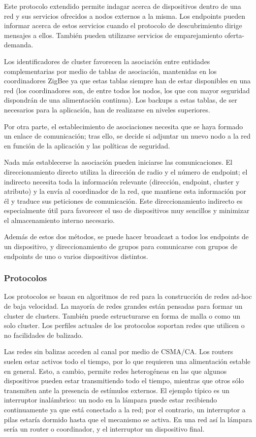 Este protocolo extendido permite indagar acerca de dispositivos dentro de una red y sus servicios ofrecidos a nodos
externos a la misma. Los endpoints pueden informar acerca de estos servicios cuando el protocolo de descubrimiento
dirige mensajes a ellos. Tambi\'en pueden utilizarse servicios de emparejamiento oferta-demanda.

Los identificadores de cluster favorecen la asociaci\'on entre entidades complementarias por medio de tablas de
asociaci\'on, mantenidas en los coordinadores ZigBee ya que estas tablas siempre han de estar disponibles en una red (los
coordinadores son, de entre todos los nodos, los que con mayor seguridad dispondr\'an de una alimentaci\'on continua). Los
backups a estas tablas, de ser necesarios para la aplicaci\'on, han de realizarse en niveles superiores.

Por otra parte, el establecimiento de asociaciones necesita que se haya formado un enlace de comunicaci\'on; tras ello, se
decide si adjuntar un nuevo nodo a la red en funci\'on de la aplicaci\'on y las pol\'iticas de seguridad.

Nada m\'as establecerse la asociaci\'on pueden iniciarse las comunicaciones. El direccionamiento directo utiliza la
direcci\'on de radio y el n\'umero de endpoint; el indirecto necesita toda la informaci\'on relevante (direcci\'on, endpoint,
cluster y atributo) y  la env\'ia al coordinador de la red, que mantiene esta informaci\'on por \'el y traduce sus peticiones
de comunicaci\'on. Este direccionamiento indirecto es especialmente \'util para favorecer el uso de dispositivos muy
sencillos y minimizar el almacenamiento interno necesario. 

Adem\'as de estos dos m\'etodos, se puede hacer broadcast a todos los endpoints de un dispositivo, y direccionamiento de
grupos para comunicarse con grupos de endpoints de uno o varios dispositivos distintos.


\subsubsection{Protocolos}
Los protocolos se basan en algoritmos de red para la construcci\'on de redes ad-hoc de baja velocidad. La mayor\'ia de redes
grandes est\'an pensadas para formar un cluster de clusters. Tambi\'en puede estructurarse en forma de malla o como un solo
cluster. Los perfiles actuales de los protocolos soportan redes que utilicen o no facilidades de balizado.

Las redes sin balizas acceden al canal por medio de CSMA/CA. Los routers suelen estar activos todo el tiempo, por lo que
requieren una alimentaci\'on estable en general. Esto, a cambio, permite redes heterog\'eneas en las que algunos
dispositivos pueden estar transmitiendo todo el tiempo, mientras que otros s\'olo transmiten ante la presencia de
est\'imulos externos. El ejemplo t\'ipico es un interruptor inal\'ambrico: un nodo en la l\'ampara puede estar recibiendo
continuamente ya que est\'a conectado a la red; por el contrario, un interruptor a pilas estar\'ia dormido hasta que el
mecanismo se activa. En una red as\'i la l\'ampara ser\'ia un router o coordinador, y el interruptor un dispositivo final.


